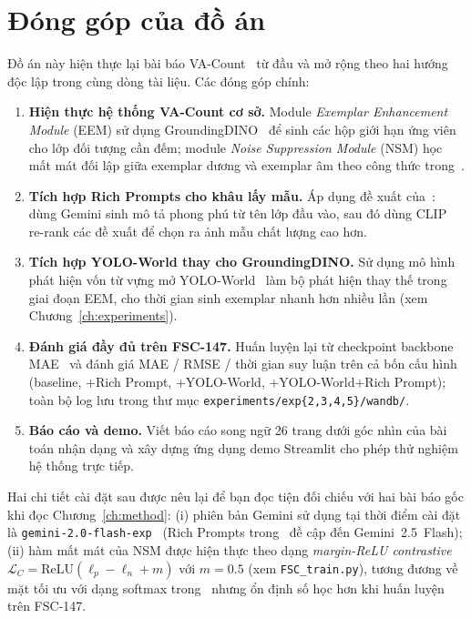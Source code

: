 \documentclass[a4paper,12pt]{report}
\numberwithin{figure}{chapter}
\numberwithin{table}{chapter}
\begin{document}
\section{Đóng góp của đồ án}
Đồ án này hiện thực lại bài báo VA-Count~\cite{vacount} từ đầu và mở rộng theo hai hướng độc lập trong cùng dòng tài liệu. Các đóng góp chính:

\begin{enumerate}
    \item \textbf{Hiện thực hệ thống VA-Count cơ sở.} Module \emph{Exemplar Enhancement Module} (EEM) sử dụng GroundingDINO~\cite{groundingdino} để sinh các hộp giới hạn ứng viên cho lớp đối tượng cần đếm; module \emph{Noise Suppression Module} (NSM) học mất mát đối lập giữa exemplar dương và exemplar âm theo công thức trong~\cite{vacount}.
    \item \textbf{Tích hợp Rich Prompts cho khâu lấy mẫu.} Áp dụng đề xuất của~\cite{richprompts}: dùng Gemini sinh mô tả phong phú từ tên lớp đầu vào, sau đó dùng CLIP~\cite{clip} re-rank các đề xuất để chọn ra ảnh mẫu chất lượng cao hơn.
    \item \textbf{Tích hợp YOLO-World thay cho GroundingDINO.} Sử dụng mô hình phát hiện vốn từ vựng mở YOLO-World~\cite{yoloworld} làm bộ phát hiện thay thế trong giai đoạn EEM, cho thời gian sinh exemplar nhanh hơn nhiều lần (xem Chương~\ref{ch:experiments}).
    \item \textbf{Đánh giá đầy đủ trên FSC-147.} Huấn luyện lại từ checkpoint backbone MAE~\cite{mae} và đánh giá MAE / RMSE / thời gian suy luận trên cả bốn cấu hình (baseline, +Rich Prompt, +YOLO-World, +YOLO-World+Rich Prompt); toàn bộ log lưu trong thư mục \mbox{\texttt{experiments/exp\{2,3,4,5\}/wandb/}}.
    \item \textbf{Báo cáo và demo.} Viết báo cáo song ngữ 26 trang dưới góc nhìn của bài toán nhận dạng và xây dựng ứng dụng demo Streamlit cho phép thử nghiệm hệ thống trực tiếp.
\end{enumerate}

Hai chi tiết cài đặt sau được nêu lại để bạn đọc tiện đối chiếu với hai bài báo gốc khi đọc Chương~\ref{ch:method}: (i) phiên bản Gemini sử dụng tại thời điểm cài đặt là \texttt{gemini-2.0-flash-exp}~\cite{gemini} (Rich Prompts trong~\cite{richprompts} đề cập đến Gemini~2.5~Flash); (ii) hàm mất mát của NSM được hiện thực theo dạng \emph{margin-ReLU contrastive} $\mathcal{L}_{C}=\mathrm{ReLU}(\ell_p-\ell_n+m)$ với $m{=}0{.}5$ (xem \texttt{FSC\_train.py}), tương đương về mặt tối ưu với dạng softmax trong~\cite{vacount} nhưng ổn định số học hơn khi huấn luyện trên FSC-147.
\end{document}
